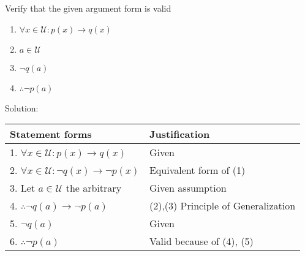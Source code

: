 \begin{bt} \end{bt}
\begin{bt} \end{bt}
\begin{bt} \end{bt}
\begin{bt} \end{bt}
\begin{bt} \end{bt}
\begin{bt} \end{bt}
\begin{bt} \end{bt}
\begin{bt} \end{bt}
\begin{longfbox}
    \begin{bt} \label{pro:practice2.29}
        Verify that the given argument form is valid
        \begin{enumerate}
            \item[] $\forall x \in \mathcal U: p(x) \rightarrow q(x)$
            \item[] $a \in \mathcal U$
            \item[] $\neg q(a)$
            \item[] $\therefore \neg p(a)$
        \end{enumerate}
    \end{bt}
\end{longfbox}

Solution:
\begin{table}[hbt!]
    \centering
    \begin{tabular}{|l | l|} 
    \hline
    Statement forms & Justification\\ [0.5ex] 
    \hline
        1. $\forall x \in \mathcal U: p(x) \rightarrow q(x)$ & Given \\
        2. $\forall x \in \mathcal U: \neg q(x) \rightarrow \neg p(x)$ & Equivalent form of (1) \\
        3. Let $a \in \mathcal U$ the arbitrary & Given assumption \\
        4. $\therefore \neg q(a) \rightarrow \neg p(a)$ & (2),(3) Principle of Generalization \\
        5. $\neg q(a)$ & Given \\
        6. $\therefore \neg p(a)$ & Valid because of (4), (5) \\
    \hline
    \end{tabular}
\end{table} 


